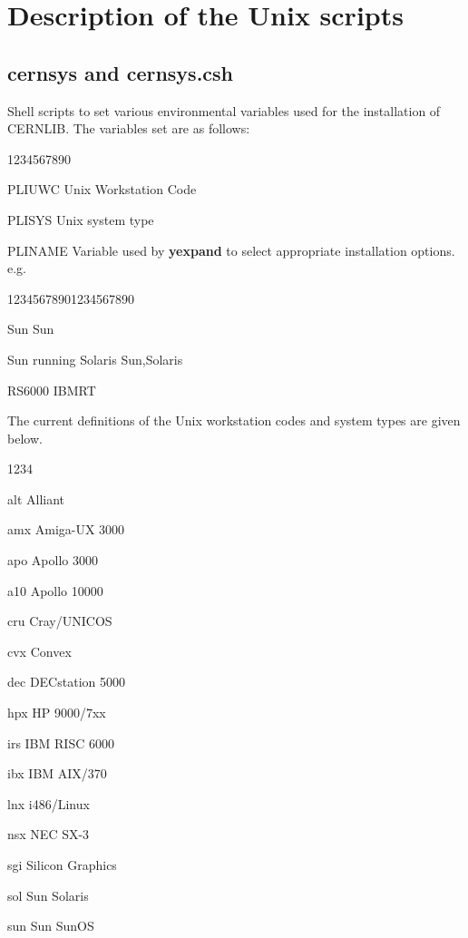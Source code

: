 \chapter{Description of the Unix scripts}

\section{cernsys and cernsys.csh}

Shell scripts to set various environmental variables used for 
the installation of CERNLIB.
The variables set are as follows:

\begin{DLtt}{1234567890}
\item[PLIUWC]Unix Workstation Code 
\item[PLISYS]Unix system type
\item[PLINAME]Variable used by {\bf yexpand} to select
appropriate installation options. e.g.
\begin{DLtt}{12345678901234567890}
\item[Sun]Sun
\item[Sun running Solaris]Sun,Solaris
\item[RS6000]IBMRT
\end{DLtt}
\end{DLtt}

The current definitions of the Unix workstation codes and system types
are given below.

\begin{DLtt}{1234}
\item[alt]Alliant            
\item[amx]Amiga-UX 3000
\item[apo]Apollo 3000        
\item[a10]Apollo 10000       
\item[cru]Cray/UNICOS        
\item[cvx]Convex             
\item[dec]DECstation 5000    
\item[hpx]HP 9000/7xx        
\item[irs]IBM RISC 6000
\item[ibx]IBM AIX/370        
\item[lnx]i486/Linux
\item[nsx]NEC SX-3
\item[sgi]Silicon Graphics
\item[sol]Sun Solaris
\item[sun]Sun SunOS
\end{DLtt}

